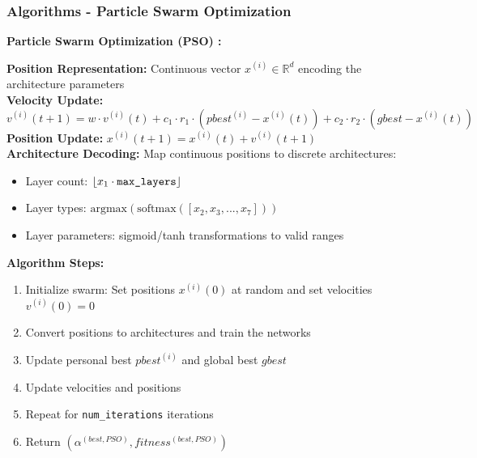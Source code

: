 \documentclass{beamer}
\begin{document}
    \begin{frame}
        \frametitle{Algorithms - Particle Swarm Optimization}
        \textbf{Particle Swarm Optimization (PSO) \cite{carvalho_particle_2007, jamous_neural_2021}:} \\ 
        {
            \footnotesize
            \textbf{Position Representation:} Continuous vector $x^{(i)} \in \mathbb{R}^d$ encoding the architecture parameters \\

            \textbf{Velocity Update:} $v^{(i)}(t+1) = w \cdot v^{(i)}(t) + c_1 \cdot r_1 \cdot \left(pbest^{(i)} - x^{(i)}(t)\right) + c_2 \cdot r_2 \cdot \left(gbest - x^{(i)}(t)\right)$ \\

            \textbf{Position Update:} $x^{(i)}(t+1) = x^{(i)}(t) + v^{(i)}(t+1)$ \\ 

            \textbf{Architecture Decoding:} Map continuous positions to discrete architectures: 
            \begin{itemize}
                \item Layer count: $\lfloor x_1 \cdot \text{\texttt{max\_layers}} \rfloor$
                \item Layer types: $\text{argmax}\left(\text{softmax}\left([x_2, x_3, ..., x_7]\right)\right)$
                \item Layer parameters: sigmoid/tanh transformations to valid ranges
            \end{itemize} 

            \textbf{Algorithm Steps:}
            \begin{enumerate}
                \item Initialize swarm: Set positions $x^{(i)}(0)$ at random and set velocities $v^{(i)}(0) = 0$
                \item Convert positions to architectures and train the networks 
                \item Update personal best $pbest^{(i)}$ and global best $gbest$ 
                \item Update velocities and positions 
                \item Repeat for \texttt{num\_iterations} iterations 
                \item Return $(\alpha^{(best, PSO)}, fitness^{(best, PSO)})$ 
            \end{enumerate}

        }
    \end{frame}
    
\end{document}

